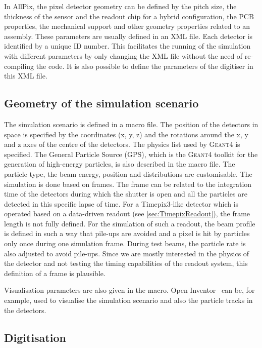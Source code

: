 In AllPix, the pixel detector geometry can be defined by the pitch
size, the thickness of the sensor and the readout chip for a hybrid
configuration, the PCB properties, the mechanical support and other
geometry properties related to an assembly. These parameters are
usually defined in an XML file. Each detector is identified by a
unique ID number. This facilitates the running of the simulation with
different parameters by only changing the XML file without the need of
re-compiling the code. It is also possible to define the parameters of
the digitiser in this XML file.
\subsection{Geometry of the simulation scenario}

The simulation scenario is defined in a macro file. The position of
the detectors in space is specified by the coordinates (x, y, z) and
the rotations around the x, y and z axes of the centre of the
detectors. The physics list used by \textsc{Geant4} is specified. The
General Particle Source (GPS), which is the \textsc{Geant4} toolkit
for the generation of high-energy particles, is also described in the
macro file. The particle type, the beam energy, position and
distributions are customisable. The simulation is done based on
frames. The frame can be related to the integration time of the
detectors during which the shutter is open and all the particles are
detected in this specific lapse of time. For a Timepix3-like detector
which is operated based on a data-driven readout (see
\cref{sec:TimepixReadout}), the frame length is not fully defined. For
the simulation of such a readout, the beam profile is defined in such
a way that pile-ups are avoided and a pixel is hit by particles only
once during one simulation frame. During test beams, the particle rate
is also adjusted to avoid pile-ups. Since we are mostly interested in
the physics of the detector and not testing the timing capabilities of
the readout system, this definition of a frame is plausible.

Visualisation parameters are also given in the macro. Open
Inventor~\cite{OpenInventor} can be, for example, used to visualise
the simulation scenario and also the particle tracks in the detectors.

\subsection{Digitisation}
\label{sec:allpix_digitisation}

